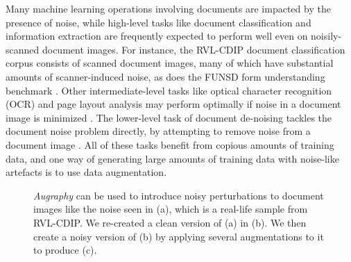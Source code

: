 \documentclass[runningheads]{llncs}
\begin{document}
Many machine learning operations involving documents are impacted by the presence of noise, while high-level tasks like document classification and information extraction are frequently expected to perform well even on noisily-scanned document images.
For instance, the RVL-CDIP document classification corpus \cite{harley2015icdar-rvlcdip} consists of scanned document images, many of which have substantial amounts of scanner-induced noise, as does the FUNSD form understanding benchmark \cite{jaume2019-funsd}.
Other intermediate-level tasks like optical character recognition (OCR) and page layout analysis may perform optimally if noise in a document image is minimized \cite{character-recognition-systems,ogorman-document-image-analysis,Rotman2022-hh}.
The lower-level task of document de-noising tackles the document noise problem directly, by attempting to remove noise from a document image \cite{ref_noisyoffice,blind-denoising-iccv-2021,kulkarni-2020,patch-based-document-denoising,Mustafa_2018-wan}.
All of these tasks benefit from copious amounts of training data, and one way of generating large amounts of training data with noise-like artefacts is to use data augmentation.

\begin{figure}
    \centering{}
    \caption{\emph{Augraphy} can be used to introduce noisy perturbations to document images like the noise seen in (a), which is a real-life sample from  RVL-CDIP. We re-created a clean version of (a) in (b). We then create a noisy version of (b) by applying several augmentations to it to produce (c).}
    \label{fig:intro}
\end{figure}
\end{document}
